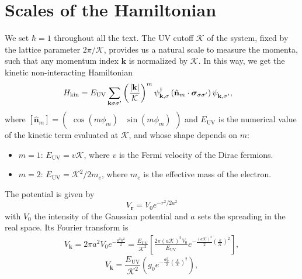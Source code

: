 \documentclass[english,aps,prd,nofootinbib,twocolumn]{revtex4-1}
\begin{document}
\section{Scales of the Hamiltonian}
We set $\hbar = 1$ throughout all the text. The UV cutoff $\mathcal{K}$ of the system, fixed by the lattice parameter $2\pi/\mathcal{K}$, provides us a natural scale to measure the momenta, such that any momentum index $\mathbf{k}$ is normalized by $\mathcal{K}$. In this way, we get the kinetic non-interacting Hamiltonian
\begin{equation}
\label{eq:Main-Ham}
\begin{split}
&H_{\mathrm{kin}} = 
E_{\mathrm{UV} }\sum_{\mathbf{k }\sigma\sigma'}
\left(\frac{|\mathbf{k}|}{\mathcal{K}}\right)^{m}
\psi_{\mathbf{k },\sigma}^{\textcolor{black}{\dagger}}
\left( \hat{\mathbf{n}}_{m} \cdot 
\boldsymbol{\sigma}_{\sigma\sigma'} \right)
\psi_{\mathbf{k },\sigma'}^{\textcolor{white}{\dagger}}
,
\end{split}
\end{equation}
where $[\hat{\mathbf{n}}_{m}]= 
\begin{pmatrix}
\cos(m\phi_{m})	&	\!\!\sin(m\phi_{m})
\end{pmatrix}$ and $E_{\mathrm{UV} }$ is the numerical value of the kinetic term evaluated at $\mathcal{K}$, and whose shape depends on $m$:
\begin{itemize}
\item $m=1$: $E_{\mathrm{UV} } = v\mathcal{K}$, where $v$ is the Fermi velocity of the Dirac fermions.
\item $m=2$: $E_{\mathrm{UV} } = \mathcal{K}^{2}/2m_{e}$, where $m_{e}$ is the effective mass of the electron. 
\end{itemize}
The potential is given by
\begin{equation}
V_{\mathbf{r}} = 
V_{0}e^{-r^{2}/2a^{2}}
\end{equation}
with $V_{0}$ the intensity of the Gaussian potential and $a$ sets the spreading in the real space. Its Fourier transform is
\begin{eqnarray*}
\nonumber	
V_{\mathbf{k}} = 2\pi a^{2}V_{0}
e^{-\tfrac{a^{2}k^{2}}{2}}\!
= \frac{E_{\mathrm{UV}}}{\mathcal{K}^{2}} 
\left[ \frac{2\pi (a\mathcal{K})^{2}V_{0}}{E_{\mathrm{UV}}}
e^{-\tfrac{(a{\mathcal{K}})^{2}}{2}
\left( \tfrac{k}{\mathcal{K}} \right)^{2}}
\right],	
\end{eqnarray*}
\vspace{-.5cm}
\begin{equation}
\label{eq:Fourier-Potential}
V_{\mathbf{k}} = \frac{E_{\mathrm{UV}}}{\mathcal{K}^{2}} 
\left( g_{0} 
e^{-\tfrac{a_{\mathcal{K}}^{2}}{2}
\left( \tfrac{k}{\mathcal{K}} \right)^{2}}
\right),	
\end{equation}
\end{document}
